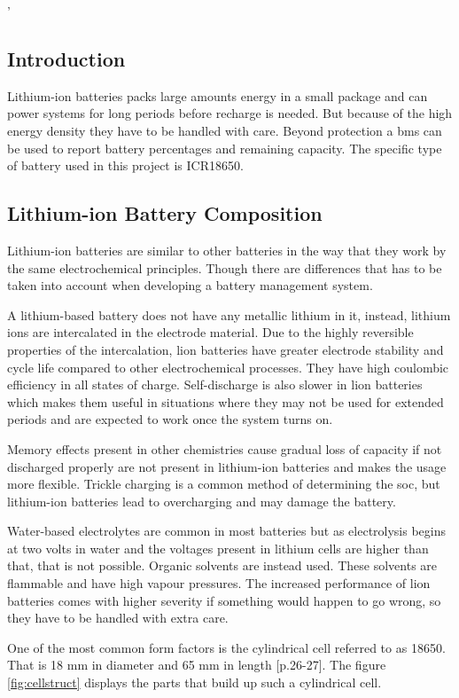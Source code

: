 '\subsection{Introduction}
Lithium-ion batteries packs large amounts energy in a small package and can power systems for long periods before recharge is needed. But because of the high energy density they have to be handled with care. Beyond protection a \gls{bms} can be used to report battery percentages and remaining capacity. The specific type of battery used in this project is ICR18650.

\subsection{Lithium-ion Battery Composition}
Lithium-ion batteries are similar to other batteries in the way that they work by the same electrochemical principles. Though there are differences that has to be taken into account when developing a battery management system.

A lithium-based battery does not have any metallic lithium in it, instead, lithium ions are intercalated in the electrode material. Due to the highly reversible properties of the intercalation, \gls{lion} batteries have greater electrode stability and cycle life compared to other electrochemical processes. They have high coulombic efficiency in all states of charge. Self-discharge is also slower in \gls{lion} batteries which makes them useful in situations where they may not be used for extended periods and are expected to work once the system turns on.

Memory effects present in other chemistries cause gradual loss of capacity if not discharged properly are not present in lithium-ion batteries and makes the usage more flexible. Trickle charging is a common method of determining the \gls{soc}, but lithium-ion batteries lead to overcharging and may damage the battery.

Water-based electrolytes are common in most batteries but as electrolysis begins at two volts in water and the voltages present in lithium cells are higher than that, that is not possible. Organic solvents are instead used. These solvents are flammable and have high vapour pressures. The increased performance of \gls{lion} batteries comes with higher severity if something would happen to go wrong, so they have to be handled with extra care.

One of the most common form factors is the cylindrical cell referred to as 18650. That is 18 mm in diameter and 65 mm in length \cite{book}[p.26-27]. The figure \autoref{fig:cellstruct} displays the parts that build up such a cylindrical cell.

